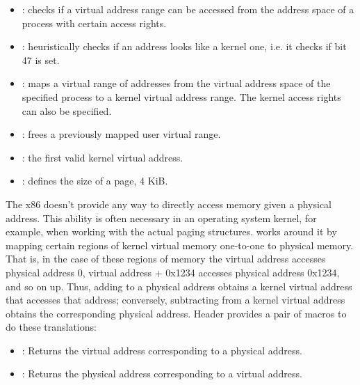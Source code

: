\begin{appendices}
\begin{itemize}
	\item {}: checks if a virtual address range can be accessed from the
address space of a process with certain access rights.

	\item {}: heuristically checks if an address looks like a kernel one, i.e.
it checks if bit 47 is set.

	\item {}: maps a virtual range of addresses from the
virtual address space of the specified process to a kernel virtual address range. The kernel access
rights can also be specified.

	\item {}: frees a previously mapped user virtual
range.

	\item {}: the first valid kernel virtual address.

	\item {}: defines the size of a page, 4 KiB.

\end{itemize}

The x86 doesn't provide any way to directly access memory given a physical address. This ability is
often necessary in an operating system kernel, for example, when working with the actual paging
structures. \projectname works around it by mapping certain regions of kernel virtual memory
one-to-one to physical memory. That is, in the case of these regions of memory the virtual address
 accesses physical address 0, virtual address 
+ 0x1234 accesses physical address 0x1234, and so on up. Thus, adding 
to a physical address obtains a kernel virtual address that accesses that address; conversely,
subtracting  from a kernel virtual address obtains the corresponding
physical address. Header  provides a pair of macros to do these translations:
\begin{itemize}
	\item {}: Returns the virtual address corresponding to a physical address.
	\item {}: Returns the physical address corresponding to a virtual address.
\end{itemize}


\end{appendices}
